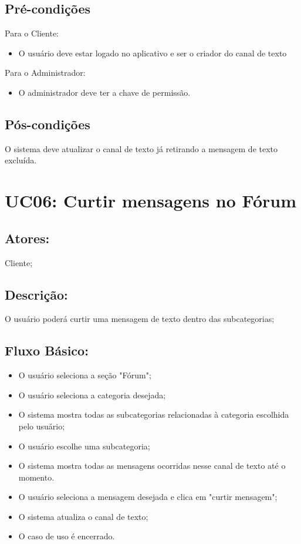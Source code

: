 \subsection{Pré-condições}
Para o Cliente: 
\begin{itemize}
    \item O usuário deve estar logado no aplicativo e ser o criador do canal de texto
\end{itemize}
Para o Administrador:
\begin{itemize}
    \item O administrador deve ter a chave de permissão. 
\end{itemize}
\subsection{Pós-condições}
O sistema deve atualizar o canal de texto já retirando a mensagem de texto excluída. 
\section{UC06: Curtir mensagens no Fórum}

\subsection{Atores:}
Cliente;
\subsection{Descrição:}
O usuário poderá curtir uma mensagem de texto dentro das subcategorias;
\subsection{Fluxo Básico:}
\begin{itemize}
    \item O usuário seleciona a seção "Fórum";
    \item O usuário seleciona a categoria desejada;
    \item O sistema mostra todas as subcategorias relacionadas à categoria escolhida pelo usuário;
    \item O usuário escolhe uma subcategoria;
    \item O sistema mostra todas as mensagens ocorridas nesse canal de texto até o momento. 
    \item O usuário seleciona a mensagem desejada e clica em "curtir mensagem";
    \item O sistema atualiza o canal de texto; 
    \item O caso de uso é encerrado. 
\end{itemize}
